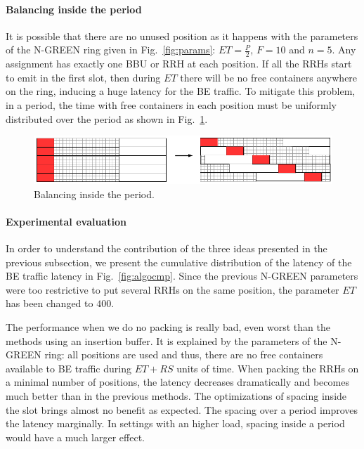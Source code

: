 \documentclass[10pt, conference, letterpaper]{IEEEtran}
\begin{document}
\paragraph{Balancing inside the period}

It is possible that there are no unused position as it happens with the parameters of the N-GREEN ring given in Fig.~\ref{fig:params}: $ET = \frac{P}{2}$, $F = 10$ and $n = 5$. Any assignment has exactly one  BBU or RRH at each position. If all the RRHs start to emit in the first slot, then during $ET$ there will be no free containers anywhere on the ring, inducing a huge latency for the BE traffic. 
To mitigate this problem, in a period, the time with free containers in each position must be uniformly distributed over the period as shown in Fig.~\ref{fig:periodbal}.
\begin{figure}[h!]
\begin{center}   

      \includegraphics[scale=0.55]{repart2}
     \caption{Balancing inside the period.}\label{fig:periodbal}
     
\end{center}
  \end{figure}  
  \paragraph{Experimental evaluation}

  In order to understand the contribution of the three ideas presented in the previous subsection,
   we present the cumulative distribution of the latency of the BE traffic latency in Fig.~\ref{fig:algocmp}. Since the previous N-GREEN parameters were too restrictive to put several RRHs on the same position, the parameter $ET$ has been changed to $400$.

The performance when we do no packing is really bad, even worst than the methods using an insertion buffer. It is explained by the parameters of the N-GREEN ring: all positions are used and thus, there are no free containers available to BE traffic during $ET+RS$ units of time. When packing the RRHs on a minimal number of positions, the latency decreases dramatically and becomes much better than in the previous methods. The optimizations of spacing inside the slot brings almost no benefit as expected. The spacing over a period improves the latency marginally. In settings with an higher load, spacing inside a period would have a much larger effect.
\end{document}
